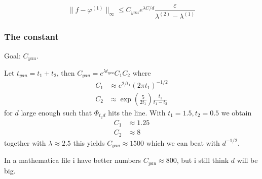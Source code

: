 \begin{equation}
    \|f-\varphi^{(1)}\|_\infty \le C_{yau} e^{\lambda C/d} \frac{\varepsilon}{\lambda^{(2)}-\lambda^{(1)}}
\end{equation}

\subsubsection{The constant}

Goal: \( C_{yau} \).

Let \( t_{yau} = t_1 + t_2 \), then \( C_{yau} = e^{\lambda t_{yau}}C_1C_2 \) where
\begin{align*}
    C_1 &\approx e^{2/t_1} (2\pi t_1)^{-1/2} \\
    C_2 &\approx \exp(\frac{5}{2t_1})\frac{t_1}{t_1 - t_2}
\end{align*}
for \( d \) large enough such that \( \Phi_{t_2 d} \) hits the line. With \( t_1 = 1.5, t_2 = 0.5 \) we obtain
\begin{align*}
    C_1 &\approx 1.25 \\
    C_2 &\approx 8
\end{align*}
together with \( \lambda \approx 2.5 \) this yields \( C_{yau} \approx 1500 \) which we can beat with \( d^{-1/2} \).

In a mathematica file i have better numbers \( C_{yau} \approx 800 \), but i still think \( d \) will be big.







 
